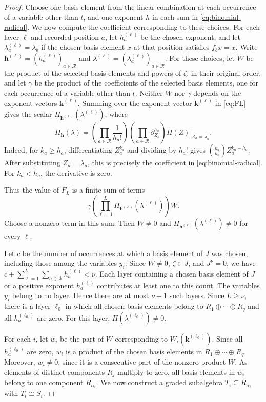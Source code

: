 \documentclass[11pt,reqno]{amsart}
\theoremstyle{definition}
\theoremstyle{remark}
\numberwithin{equation}{section}
\begin{document}
\begin{proof}
Choose one basis element from the linear combination at each
occurrence of a variable other than $t$, and one exponent $h$
in each sum in \eqref{eq:binomial-radical}.
We now compute the coefficient corresponding to these choices.
For each layer $\ell$ and recorded position $a$,
let $h_a^{(\ell)}$ be the chosen exponent, and let
$\lambda_a^{(\ell)}=\lambda_b$ if the chosen basis element
$x$ at that position satisfies $f_bx=x$.
Write
$\mathbf h^{(\ell)}=(h_a^{(\ell)})_{a\in\mathcal R}$
and
$\lambda^{(\ell)}=(\lambda_a^{(\ell)})_{a\in\mathcal R}$.
For these choices, let $W$ be the product of
the selected basis elements and powers of $\zeta$,
in their original order, and let $\gamma$ be the
product of the coefficients of the selected basis
elements, one for each occurrence of a variable
other than $t$.
Neither $W$ nor $\gamma$ depends on the exponent
vectors $\mathbf k^{(\ell)}$.
Summing over the exponent vector $\mathbf k^{(\ell)}$
in \eqref{eq:FL} gives the scalar
$H_{\mathbf h^{(\ell)}}(\lambda^{(\ell)})$, where
\[
H_{\mathbf h}(\lambda)
=
\left(\prod_{a\in\mathcal R}\frac{1}{h_a!}\right)
\left(\prod_{a\in\mathcal R}\partial_{Z_a}^{h_a}\right)
H(Z)\bigg|_{Z_a=\lambda_a}.
\]
Indeed, for $k_a\geq h_a$, differentiating $Z_a^{k_a}$
and dividing by $h_a!$ gives
$\binom{k_a}{h_a}Z_a^{k_a-h_a}$.
After substituting $Z_a=\lambda_a$, this is precisely
the coefficient in \eqref{eq:binomial-radical}.
For $k_a<h_a$, the derivative is zero.

Thus the value of $F_L$ is a finite sum of terms
\[
\gamma
\left(
\prod_{\ell=1}^L
H_{\mathbf h^{(\ell)}}(\lambda^{(\ell)})
\right)W.
\]
Choose a nonzero term in this sum.
Then $W\ne0$ and
$H_{\mathbf h^{(\ell)}}(\lambda^{(\ell)})\ne0$
for every $\ell$.


Let $c$ be the number of occurrences at which a basis
element of $J$ was chosen, including those among the
variables $y_i$.
Since $W\ne0$, $\zeta\in J$, and $J^\nu=0$, we have $
c+\sum_{\ell=1}^L\sum_{a\in\mathcal R}
h_a^{(\ell)}<\nu$.
Each layer containing a chosen basis element of $J$
or a positive exponent $h_a^{(\ell)}$ contributes
at least one to this count.
The variables $y_i$ belong to no layer.
Hence there are at most $\nu-1$ such layers.
Since $L\geq\nu$, there is a layer $\ell_0$ in which
all chosen basis elements belong to
$R_1\oplus\cdots\oplus R_q$
and all $h_a^{(\ell_0)}$ are zero.
For this layer, $H(\lambda^{(\ell_0)})\ne0$.



For each $i$, let $w_i$ be the part of $W$ corresponding to
$W_i(\mathbf k^{(\ell_0)})$.
Since all $h_a^{(\ell_0)}$ are zero, $w_i$ is a product
of the chosen basis elements in
$R_1\oplus\cdots\oplus R_q$.
Moreover, $w_i\ne0$, since it is a consecutive part
of the nonzero product $W$.
As elements of distinct components $R_j$ multiply to zero,
all basis elements in $w_i$ belong to one component
$R_{\alpha_i}$.
We now construct a graded subalgebra
$T_i\subseteq R_{\alpha_i}$ with $T_i\cong S_i$.


\end{proof}
\end{document}
